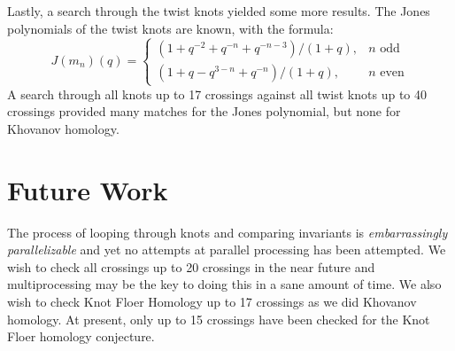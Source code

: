 \documentclass{article}
\theoremstyle{plain}
\begin{document}
        Lastly, a search through the twist knots yielded some more results.
        The Jones polynomials of the twist knots are known, with the formula:
        \begin{equation}
            J(m_{n})(q)=
            \begin{cases}
                (1+q^{-2}+q^{-n}+q^{-n-3})/(1+q),&n\textrm{ odd}\\
                (1+q-q^{3-n}+q^{-n})/(1+q),&n\textrm{ even}
            \end{cases}
        \end{equation}
        A search through all knots up to 17 crossings against all twist knots
        up to 40 crossings provided many matches for the Jones polynomial, but
        none for Khovanov homology.
    \section{Future Work}
        The process of looping through knots and comparing invariants is
        \textit{embarrassingly parallelizable} and yet no attempts at
        parallel processing has been attempted. We wish to check all crossings
        up to 20 crossings in the near future and multiprocessing may be the
        key to doing this in a sane amount of time. We also wish to check
        Knot Floer Homology up to 17 crossings as we did Khovanov homology.
        At present, only up to 15 crossings have been checked for the Knot
        Floer homology conjecture.
    \newpage
    
    
    \newpage
\end{document}
